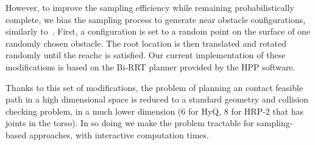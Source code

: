 However, to improve the sampling efficiency while remaining probabilistically complete, we bias the sampling process to generate near obstacle configurations, similarly to~\cite{Amato98choosinggood}.
First, a configuration is set to a random point on the surface of one randomly chosen obstacle. The root location is then translated and rotated randomly until the \gls{reachc} is satisfied.
Our current implementation of these modifications is based on the Bi-RRT planner \citep{770022} provided by the HPP software.

Thanks to this set of modifications, the problem of planning an \gls{contact feasible} path in a high dimensional space is reduced to a standard geometry and collision checking problem, in a much lower dimension (6 for HyQ, 8 for HRP-2 that has joints in the torso). In so doing we make the problem tractable for sampling-based approaches, with \gls{interactive} computation times.

